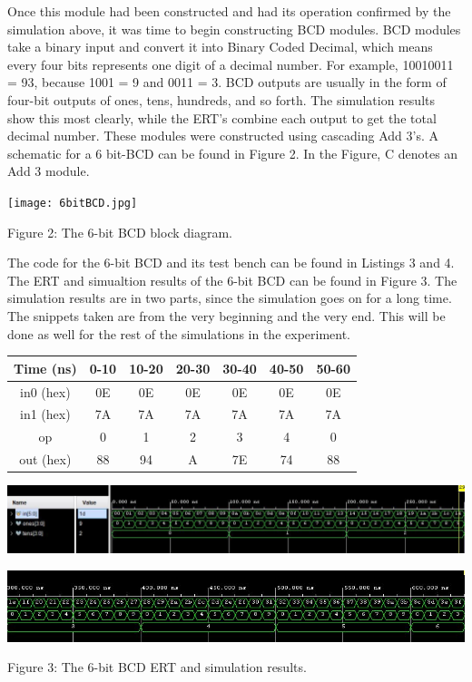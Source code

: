 \documentclass[11pt]{article}
\begin{document}
Once this module had been constructed and had its operation confirmed by the simulation above, it was time to begin constructing BCD modules. BCD modules take a binary input and convert it into Binary Coded Decimal, which means every four bits represents one digit of a decimal number. For example, 10010011 = 93, because 1001 = 9 and 0011 = 3. BCD outputs are usually in the form of four-bit outputs of ones, tens, hundreds, and so forth. The simulation results show this most clearly, while the ERT's combine each output to get the total decimal number. These modules were constructed using cascading Add 3's. A schematic for a 6 bit-BCD can be found in Figure 2. In the Figure, C denotes an Add 3 module.

\begin{center}
	\texttt{[image: 6bitBCD.jpg]}

	Figure 2: The 6-bit BCD block diagram.
\end{center}

The code for the 6-bit BCD and its test bench can be found in Listings 3 and 4. The ERT and simualtion results of the 6-bit BCD can be found in Figure 3. The simulation results are in two parts, since the simulation goes on for a long time. The snippets taken are from the very beginning and the very end. This will be done as well for the rest of the simulations in the experiment.

\begin{center}
	
	\begin{tabular}{c|cccccc}
		\toprule
		Time (ns) & 0-10 & 10-20 & 20-30 & 30-40 & 40-50 & 50-60\\
		\midrule
		in0 (hex) & 0E & 0E & 0E & 0E & 0E & 0E\\
		in1 (hex) & 7A & 7A & 7A & 7A & 7A & 7A\\
		op & 0 & 1 & 2 & 3 & 4 & 0\\
		\midrule
		out (hex) & 88 & 94 & A & 7E & 74 & 88\\
		\bottomrule
	\end{tabular} 
	
	
	\includegraphics[width=\textwidth]{BCD_6b_beg.JPG}
	
	\includegraphics[width=\textwidth]{BCD_6b_end.JPG}
	
	Figure 3: The 6-bit BCD ERT and simulation results.
\end{center}
\end{document}
